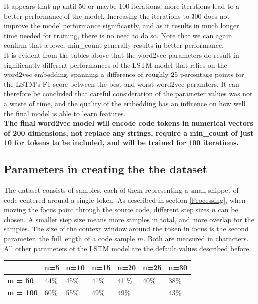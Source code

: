 \documentclass[
	a4paper,
	pagesize,
	pdftex,
	12pt,
	twoside, %
	BCOR=5mm, %
	ngerman,
	fleqn,
	final,
	]{scrartcl}
\begin{document}
It appears that up until 50 or maybe 100 iterations, more iterations lead to a better performance of the model. Increasing the iterations to 300 does not improve the model performance significantly, and as it results in much longer time needed for training, there is no need to do so. Note that we can again confirm that a lower min\_count generally results in better performance.\\
It is evident from the tables above that the word2vec parameters do result in significantly different performances of the LSTM model that relies on the word2vec embedding, spanning a difference of roughly 25 percentage points for the LSTM's F1 score between the best and worst word2vec paramters. It can therefore be concluded that careful consideration of the parameter values was not a waste of time, and the quality of the embedding has an influence on how well the final model is able to learn features.\\

\textbf{The final word2vec model will encode code tokens in numerical vectors of 200 dimensions, not replace any strings, require a min\_count of just 10 for tokens to be included, and will be trained for 100 iterations.}\\


\subsection{Parameters in creating the the dataset}

The dataset consists of samples, each of them representing a small snippet of code centered around a single token. As described in section \ref{Processing}, when moving the focus point through the source code, different step sizes $n$ can be chosen. A smaller step size means more samples in total, and more overlap for the samples. The size of the context window around the token in focus is the second parameter, the full length of a code sample $m$. Both are measured in characters. All other parameters of the LSTM model are the default values described before.

\begin{tabular}{|p{2cm}||p{1.7cm}|p{1.7cm}|p{1.7cm}|p{1.7cm}|p{1.7cm}|p{1.7cm}|}
	\hline
	 		& \textbf{n=5} &\textbf{n=10} & \textbf{n=15} & \textbf{n=20} & \textbf{n=25} & \textbf{n=30} \\
	\hline
	 \textbf{m = 50} & 44\% & 45\% &41\% &41 \%& 40\% & 38\% \\ 
	 \textbf{m = 100} & 60\% & 55\% &49\% &49\%&   &43\% \\
	 \hline
	 \hline
\end{tabular}
\end{document}
